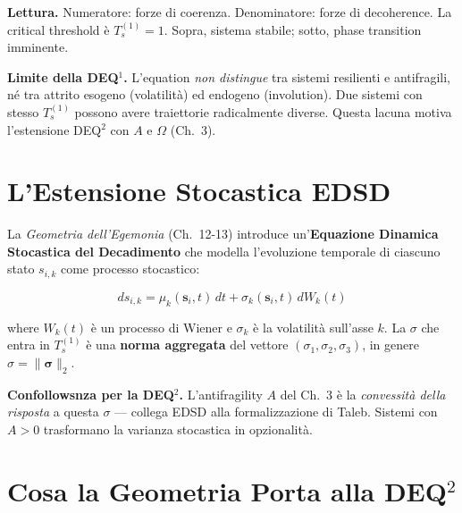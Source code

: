 \Proved{} \textbf{Lettura.} Numeratore: forze di coerenza. Denominatore:
forze di decoherence. La critical threshold è \(T_s^{(1)} = 1\). Sopra,
sistema stabile; sotto, phase transition imminente.

\Conj{} \textbf{Limite della DEQ$^1$.} L'equation \emph{non distingue} tra
sistemi resilienti e antifragili, né tra attrito esogeno (volatilità) ed
endogeno (involution). Due sistemi con stesso \(T_s^{(1)}\) possono
avere traiettorie radicalmente diverse. Questa lacuna motiva
l'estensione DEQ$^2$ con \(A\) e \(\Omega\) (Ch.~3).



\section{L'Estensione Stocastica
EDSD}\label{lestensione-stocastica-edsd}

La \emph{Geometria dell'Egemonia} (Ch.~12-13) introduce
un'\textbf{Equazione Dinamica Stocastica del Decadimento} che modella
l'evoluzione temporale di ciascuno stato \(s_{i,k}\) come processo
stocastico:

\[
ds_{i,k} = \mu_k(\mathbf{s}_i, t)\, dt + \sigma_k(\mathbf{s}_i, t)\, dW_k(t)
\]

where \(W_k(t)\) è un processo di Wiener e \(\sigma_k\) è la volatilità
sull'asse \(k\). La \(\sigma\) che entra in \(T_s^{(1)}\) è una
\textbf{norma aggregata} del vettore \((\sigma_1, \sigma_2, \sigma_3)\),
in genere \(\sigma = \|\boldsymbol{\sigma}\|_2\).

\Hypoth{} \textbf{Confollowsnza per la DEQ$^2$.} L'antifragility \(A\) del
Ch.~3 è la \emph{convessità della risposta} a questa \(\sigma\) ---
collega EDSD alla formalizzazione di Taleb. Sistemi con \(A > 0\)
trasformano la varianza stocastica in opzionalità.



\section{Cosa la Geometria Porta alla
DEQ$^2$}\label{cosa-la-geometria-porta-alla-dequxb2}

